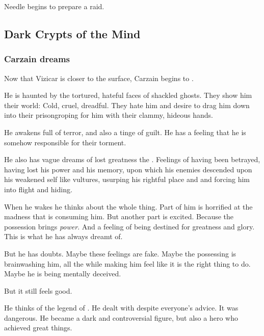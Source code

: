 Needle begins to prepare a raid. 









\subsection{Dark Crypts of the Mind}
\subsubsection{Carzain dreams}
Now that Vizicar is closer to the surface, Carzain begins to . 

He is haunted by the tortured, hateful faces of shackled ghosts. They show him their world: Cold, cruel, dreadful. They hate him and desire to drag him down into their prison\dash groping for him with their clammy, hideous hands. 

He awakens full of terror, and also a tinge of guilt. He has a feeling that he is somehow responsible for their torment. 

He also has vague dreams of lost greatness\dash {} the . Feelings of having been betrayed, having lost his power and his memory, upon which his enemies descended upon his weakened self like vultures, usurping his rightful place and \honour and forcing him into flight and hiding. 

When he wakes he thinks about the whole thing. 
Part of him is horrified at the madness that is consuming him. 
But another part is excited. 
Because the possession brings \emph{power}. 
And a feeling of being destined for greatness and glory. 
This is what he has always dreamt of. 

But he has doubts. 
Maybe these feelings are fake. 
Maybe the possessing \Archon{} is brainwashing him, all the while making him feel like it is the right thing to do. 
Maybe he is being mentally deceived. 

But it still feels good. 

He thinks of the legend of . 
He dealt with \qliphoth{} despite everyone's advice. 
It was dangerous. 
He became a dark and controversial figure, but also a hero who achieved great things. 





